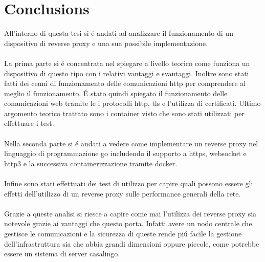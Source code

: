 \chapter{Conclusions}
\label{cha:conclusions}

All'interno di questa tesi si é andati ad analizzare il funzionamento di un dispositivo di reverse proxy e una sua possibile implementazione.\\\\
La prima parte si é concentrata nel spiegare a livello teorico come funziona un dispositivo di questo tipo con i relativi vantaggi e svantaggi. Inoltre sono stati fatti dei cenni di funzionamento delle comunicazioni http per comprendere al meglio il funzionamento. É stato quindi spiegato il funzionamento delle comunicazioni web tramite le i protocolli http, tls e l'utilizza di certificati. Ultimo argomento teorico trattato sono i container visto che sono stati utilizzati per effettuare i test.\\\\
Nella seconda parte si é andati a vedere come implementare un reverse proxy nel linguaggio di programmazione go includendo il supporto a https, websocket e http3 e la successiva containerizzazione tramite docker.\\\\
Infine sono stati effettuati dei test di utilizzo per capire quali possono essere gli effetti dell'utilizzo di un reverse proxy sulle performance generali della rete.\\\\
Grazie a queste analisi si riesce a capire come mai l'utilizza dei reverse proxy sia notevole grazie ai vantaggi che questo porta. Infatti avere un nodo centrale che gestisce le comunicazioni e la sicurezza di queste rende piú facile la gestione dell'infrastruttura sia che abbia grandi dimensioni oppure piccole, come potrebbe essere un sistema di server casalingo.
